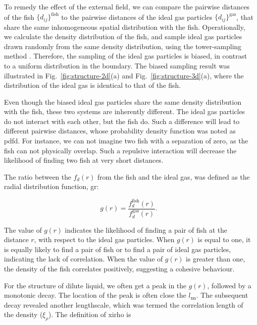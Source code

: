 \documentclass[11pt,twoside]{report}
\begin{document}
To remedy the effect of the external field, we can compare the pairwise distances of the fish $\{d_{ij}\}^\textrm{fish}$ to the pairwise distances of the ideal gas particles $\{d_{ij}\}^\textrm{gas}$, that share the same inhomogeneous spatial distribution with the fish.
Operationally, we calculate the density distribution of the fish, and sample ideal gas particles drawn randomly from the same density distribution, using the tower-sampling method \cite{krauth2006}.
Therefore, the sampling of the ideal gas particles is biased, in contrast to a uniform distribution in the boundary. The biased sampling result was illustrated in Fig.~\ref{fig:structure-2d}(a) and Fig.~\ref{fig:structure-3d}(a), where the distribution of the ideal gas is identical to that of the fish.


Even though the biased ideal gas particles share the same density distribution with the fish, these two systems are inherently different. The ideal gas particles do not interact with each other, but the fish do.
Such a difference will lead to different pairwise distances, whose probability density function was noted as \gls{pdfd}.
For instance, we can not imagine two fish with a separation of zero, as the fish can not physically overlap.
Such a repulsive interaction will decrease the likelihood of finding two fish at very short distances.
 
The ratio between the $f_d(r)$ from the fish and the ideal gas, was defined as the radial distribution function, \gls{gr}:

\begin{equation}
	g(r) = \frac{f_d^\textrm{fish}(r)}{f_d^\textrm{gas}(r)}.
\label{eq:gr}
\end{equation}

\noindent The value of $g(r)$ indicates the likelihood of finding a pair of fish at the distance $r$, with respect to the ideal gas particles. When $g(r)$ is equal to one, it is equally likely to find a pair of fish or to find a pair of ideal gas particles, indicating the lack of correlation. When the value of $g(r)$ is greater than one, the density of the fish correlates positively, suggesting a cohesive behaviour.

For the structure of dilute liquid, we often get a peak in the $g(r)$, followed by a monotonic decay. The location of the peak is often close the $l_\mathrm{nn}$. The subsequent decay revealed another lengthscale, which was termed the correlation length of the density ($\xi_\rho$). The definition of \gls{xirho} is
\end{document}
